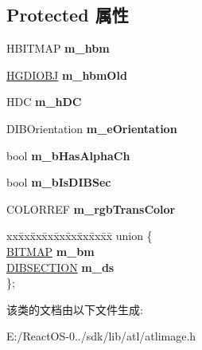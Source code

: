 \subsection*{Protected 属性}
\begin{DoxyCompactItemize}
\item 
\mbox{\label{class_a_t_l_1_1_c_image_a03798c6bebc0c900ed0c22900c7fdb1b}} 
H\+B\+I\+T\+M\+AP {\bfseries m\+\_\+hbm}
\item 
\mbox{\label{class_a_t_l_1_1_c_image_ab0f7d4a0eb0d98e3adf1840a6a75064a}} 
\hyperlink{interfacevoid}{H\+G\+D\+I\+O\+BJ} {\bfseries m\+\_\+hbm\+Old}
\item 
\mbox{\label{class_a_t_l_1_1_c_image_ad15417a7c7b5c3a7eece88b82b92f62c}} 
H\+DC {\bfseries m\+\_\+h\+DC}
\item 
\mbox{\label{class_a_t_l_1_1_c_image_a02e800b1977d5b5fe46c3ee7bf4d749d}} 
D\+I\+B\+Orientation {\bfseries m\+\_\+e\+Orientation}
\item 
\mbox{\label{class_a_t_l_1_1_c_image_aab022344c089f42e6d364f2631a3c863}} 
bool {\bfseries m\+\_\+b\+Has\+Alpha\+Ch}
\item 
\mbox{\label{class_a_t_l_1_1_c_image_a1b9baeb9bcb5c758b536ea198d19c943}} 
bool {\bfseries m\+\_\+b\+Is\+D\+I\+B\+Sec}
\item 
\mbox{\label{class_a_t_l_1_1_c_image_a0ba9526f21995d1f8ffb6a35a1371f8f}} 
C\+O\+L\+O\+R\+R\+EF {\bfseries m\+\_\+rgb\+Trans\+Color}
\item 
\mbox{\label{class_a_t_l_1_1_c_image_a6a0e820d902d6d4576a667704cd96c61}} 
\begin{tabbing}
xx\=xx\=xx\=xx\=xx\=xx\=xx\=xx\=xx\=\kill
union \{\\
\>\hyperlink{struct___b_i_t_m_a_p}{BITMAP} {\bfseries m\_bm}\\
\>\hyperlink{structtag_d_i_b_s_e_c_t_i_o_n}{DIBSECTION} {\bfseries m\_ds}\\
\}; \\

\end{tabbing}\end{DoxyCompactItemize}


该类的文档由以下文件生成\+:\begin{DoxyCompactItemize}
\item 
E\+:/\+React\+O\+S-\/0../sdk/lib/atl/atlimage.\+h\end{DoxyCompactItemize}
